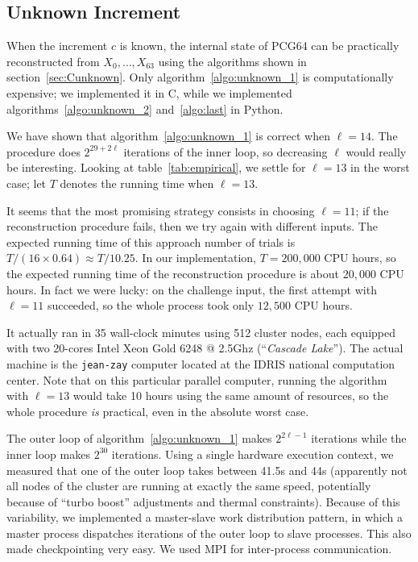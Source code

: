 \documentclass[journal=tosc,final]{iacrtrans}
\begin{document}
\subsection{Unknown Increment}

When the increment $c$ is known, the internal state of \textsf{PCG64} can be
practically reconstructed from $X_0, \dots, X_{63}$ using the algorithms shown
in section~\ref{sec:Cunknown}. Only algorithm~\ref{algo:unknown_1} is
computationally expensive; we implemented it in \textsf{C}, while we implemented
algorithms~\ref{algo:unknown_2} and~\ref{algo:last} in \textsf{Python}.

We have shown that algorithm~\ref{algo:unknown_1} is correct when $\ell=14$. The
procedure does $2^{29 + 2\ell}$ iterations of the inner loop, so decreasing
$\ell$ would really be interesting. Looking at table~\ref{tab:empirical}, we
settle for $\ell=13$ in the worst case; let $T$ denotes the running time when
$\ell=13$.

It seems that the most promising strategy consists in choosing $\ell=11$; if the
reconstruction procedure fails, then we try again with different inputs. The
expected running time of this approach number of trials is
$T/(16 \times 0.64) \approx T / 10.25$. In our implementation, $T = 200,000$ CPU
hours, so the expected running time of the reconstruction procedure is about
$20,000$ CPU hours. In fact we were lucky: on the challenge input, the first
attempt with $\ell=11$ succeeded, so the whole process took only $12,500$ CPU
hours.

It actually ran in 35 wall-clock minutes using 512 cluster nodes, each equipped
with two 20-cores \textsf{Intel Xeon Gold 6248 @ 2.5Ghz} (``\emph{Cascade
  Lake}''). The actual machine is the \texttt{jean-zay} computer located at the
IDRIS national computation center. Note that on this particular parallel
computer, running the algorithm with $\ell=13$ would take 10 hours using the
same amount of resources, so the whole procedure \emph{is} practical, even in
the absolute worst case.

The outer loop of algorithm~\ref{algo:unknown_1} makes $2^{2\ell - 1}$
iterations while the inner loop makes $2^{30}$ iterations. Using a single
hardware execution context, we measured that one of the outer loop takes between
41.5s and 44s (apparently not all nodes of the cluster are running at exactly
the same speed, potentially because of ``turbo boost'' adjustments and thermal
constraints). Because of this variability, we implemented a master-slave work
distribution pattern, in which a master process dispatches iterations of the
outer loop to slave processes. This also made checkpointing very easy. We used
\textsf{MPI} for inter-process communication.
\end{document}
